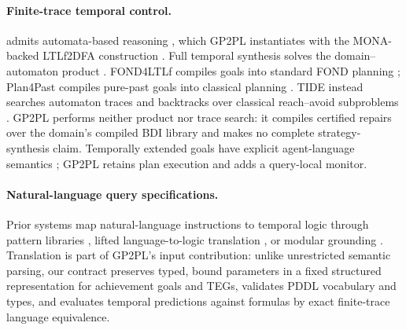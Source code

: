 \paragraph{Finite-trace temporal control.}
\ltlf{} admits automata-based reasoning \cite{DeGiacomoVardi2013}, which GP2PL
instantiates with the MONA-backed LTLf2DFA construction
\cite{Fuggitti2020LTLf2DFA,Henriksen1995MONA}. Full temporal synthesis solves
the domain--automaton product \cite{DeGiacomoRubin2018AutomataFOND}. FOND4LTLf
compiles \ltlf{} goals into standard FOND planning
\cite{DeGiacomoFuggitti2021FOND4LTLf}; Plan4Past compiles pure-past goals into
classical planning \cite{Bonassi2023Plan4Past}. TIDE instead
searches automaton traces and backtracks over classical reach--avoid subproblems
\cite{Suprun2026TIDE}. GP2PL performs neither product nor trace search: it
compiles certified repairs over the domain's compiled BDI library and makes no
complete strategy-synthesis claim. Temporally extended goals have explicit
agent-language semantics \cite{Hindriks2009TemporalGoals}; GP2PL retains
plan execution and adds a query-local monitor.

\paragraph{Natural-language query specifications.}
Prior systems map natural-language instructions to temporal logic through
pattern libraries \cite{FuggittiChakraborti2023NL2LTL}, lifted
language-to-logic translation \cite{Chen2023NL2TL,Guo2025CaStL}, or modular
grounding \cite{Liu2023Lang2LTL}. Translation is
part of GP2PL's input contribution: unlike unrestricted semantic parsing, our
contract preserves typed, bound parameters in a fixed structured
representation for achievement goals and TEGs, validates PDDL vocabulary and
types, and evaluates temporal predictions against formulas by exact
finite-trace language equivalence.
